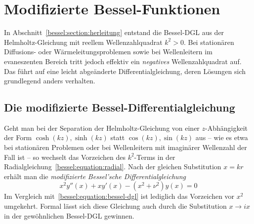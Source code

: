 %
%
%
%
\section{Modifizierte Bessel-Funktionen
\label{bessel:section:modifiziert}}
%

In Abschnitt~\ref{bessel:section:herleitung} entstand die Bessel-DGL aus der Helmholtz-Gleichung mit reellem Wellenzahlquadrat $k^2 > 0$.
Bei stationären Diffusions- oder Wärmeleitungsproblemen sowie bei Wellenleitern im evaneszenten Bereich tritt jedoch effektiv ein \emph{negatives} Wellenzahlquadrat auf.
Das führt auf eine leicht abgeänderte Differentialgleichung, deren Lösungen sich grundlegend anders verhalten.

\subsection{Die modifizierte Bessel-Differentialgleichung
\label{bessel:subsection:mod-dgl}}

Geht man bei der Separation der Helmholtz-Gleichung von einer $z$-Abhängigkeit der Form $\cosh(kz), \sinh(kz)$ statt $\cos(kz), \sin(kz)$ aus -- wie es etwa bei stationären Problemen oder bei Wellenleitern mit imaginärer Wellenzahl der Fall ist -- so wechselt das Vorzeichen des $k^2$-Terms in der Radialgleichung~\eqref{bessel:equation:radial}.
Nach der gleichen Substitution $x = kr$ erhält man die \emph{modifizierte Bessel'sche Differentialgleichung}
\begin{equation}
\boxed{\;
x^2 y''(x) + x y'(x) - (x^2 + \nu^2) y(x) = 0\;
}
\label{bessel:equation:mod-bessel-dgl}
\end{equation}
Im Vergleich mit~\eqref{bessel:equation:bessel-dgl} ist lediglich das Vorzeichen vor $x^2$ umgekehrt.
Formal lässt sich diese Gleichung auch durch die Substitution $x \to ix$ in der gewöhnlichen Bessel-DGL gewinnen.

